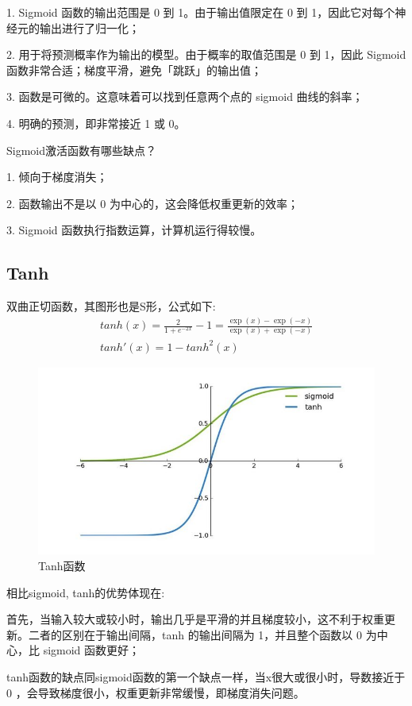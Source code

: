 \documentclass{article}
\begin{document}
1. Sigmoid 函数的输出范围是 0 到 1。由于输出值限定在 0 到 1，因此它对每个神经元的输出进行了归一化；

2. 用于将预测概率作为输出的模型。由于概率的取值范围是 0 到 1，因此 Sigmoid 函数非常合适；梯度平滑，避免「跳跃」的输出值；

3. 函数是可微的。这意味着可以找到任意两个点的 sigmoid 曲线的斜率；

4. 明确的预测，即非常接近 1 或 0。

Sigmoid激活函数有哪些缺点？

1. 倾向于梯度消失；

2. 函数输出不是以 0 为中心的，这会降低权重更新的效率；

3. Sigmoid 函数执行指数运算，计算机运行得较慢。

\subsection{Tanh}
双曲正切函数，其图形也是S形，公式如下:
\begin{align}
tanh(x) = \frac{2}{1+e^{-2x}} - 1 = \frac{\exp(x) - \exp(-x)} {\exp(x) + \exp(-x)}  \\
tanh'(x) = 1 - tanh^2(x)
\end{align}
\begin{figure}[htp]
\centering
\includegraphics[scale=0.3]{images/activation/tanh.jpg}
\caption{Tanh函数}
\label{Fig.tanh}
\end{figure}
相比sigmoid, tanh的优势体现在:

首先，当输入较大或较小时，输出几乎是平滑的并且梯度较小，这不利于权重更新。二者的区别在于输出间隔，tanh 的输出间隔为 1，并且整个函数以 0 为中心，比 sigmoid 函数更好；

tanh函数的缺点同sigmoid函数的第一个缺点一样，当x很大或很小时，导数接近于 0 ，会导致梯度很小，权重更新非常缓慢，即梯度消失问题。
\end{document}
